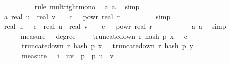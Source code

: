 \begin{isabellebody}
\ \ \ \ \ \ \ \ \isamarkupfalse%
\ {\isacharparenleft}{\kern0pt}rule\ mult{\isacharunderscore}{\kern0pt}right{\isacharunderscore}{\kern0pt}mono{\isacharparenright}{\kern0pt}\ \isamarkupfalse%
\ a{\isacharunderscore}{\kern0pt}{}\ a{\isacharunderscore}{\kern0pt}{}\ \isamarkupfalse%
\ simp{\isacharplus}{\kern0pt}\isanewline
\ \ \ \ \ \ \isamarkupfalse%
\ \isamarkupfalse%
\ a{\isacharunderscore}{\kern0pt}{}{\isacharcolon}{\kern0pt}\ {\isachardoublequoteopen}{\isasymbar}real\ u\ {\isacharminus}{\kern0pt}\ real\ v{\isasymbar}\ {\isasymle}\ {}\ {\isacharasterisk}{\kern0pt}\ c\ {\isacharasterisk}{\kern0pt}\ {}\ powr\ {\isacharparenleft}{\kern0pt}{\isacharminus}{\kern0pt}real\ r{\isacharparenright}{\kern0pt}{\isachardoublequoteclose}\isanewline
\ \ \ \ \ \ \ \ \isamarkupfalse%
\ simp\isanewline
\isanewline
\ \ \ \ \ \ \isamarkupfalse%
\ {\isachardoublequoteopen}real\ u\ {\isasymle}\ {}{\isacharasterisk}{\kern0pt}\ c\ {\isasymand}\ {\isasymbar}real\ u\ {\isacharminus}{\kern0pt}\ real\ v{\isasymbar}\ {\isasymle}\ {}\ {\isacharasterisk}{\kern0pt}\ c\ {\isacharasterisk}{\kern0pt}\ {}\ powr\ {\isacharparenleft}{\kern0pt}{\isacharminus}{\kern0pt}real\ r{\isacharparenright}{\kern0pt}{\isachardoublequoteclose}\ \isanewline
\ \ \ \ \ \ \ \ \isamarkupfalse%
\ a{\isacharunderscore}{\kern0pt}{}\ a{\isacharunderscore}{\kern0pt}{}\ \isamarkupfalse%
\ simp\isanewline
\ \ \ \ \isamarkupfalse%
\isanewline
\isanewline
\ \ \ \ \isamarkupfalse%
\ {\isachardoublequoteopen}measure\ {\isasymOmega}\ {\isacharbraceleft}{\kern0pt}{\isasymomega}{\isachardot}{\kern0pt}\ degree\ {\isasymomega}\ {\isasymge}\ {}\ {\isasymand}\ truncate{\isacharunderscore}{\kern0pt}down\ r\ {\isacharparenleft}{\kern0pt}hash\ p\ x\ {\isasymomega}{\isacharparenright}{\kern0pt}\ {\isasymle}\ c\ {\isasymand}\isanewline
\ \ \ \ \ \ truncate{\isacharunderscore}{\kern0pt}down\ r\ {\isacharparenleft}{\kern0pt}hash\ p\ x\ {\isasymomega}{\isacharparenright}{\kern0pt}\ {\isacharequal}{\kern0pt}\ truncate{\isacharunderscore}{\kern0pt}down\ r\ {\isacharparenleft}{\kern0pt}hash\ p\ y\ {\isasymomega}{\isacharparenright}{\kern0pt}{\isacharbraceright}{\kern0pt}\ {\isasymle}\isanewline
\ \ \ \ \ \ measure\ {\isasymOmega}\ {\isacharparenleft}{\kern0pt}{\isasymUnion}\ i\ {\isasymin}\ {\isacharbraceleft}{\kern0pt}{\isacharparenleft}{\kern0pt}u{\isacharcomma}{\kern0pt}v{\isacharparenright}{\kern0pt}\ {\isasymin}\ {\isacharbraceleft}{\kern0pt}{}{\isachardot}{\kern0pt}{\isachardot}{\kern0pt}{\isacharless}{\kern0pt}p{\isacharbraceright}{\kern0pt}\ {\isasymtimes}\ {\isacharbraceleft}{\kern0pt}{}{\isachardot}{\kern0pt}{\isachardot}{\kern0pt}{\isacharless}{\kern0pt}p{\isacharbraceright}{\kern0pt}{\isachardot}{\kern0pt}\ u\ {\isasymnoteq}\ v\ {\isasymand}\isanewline

\end{isabellebody}
